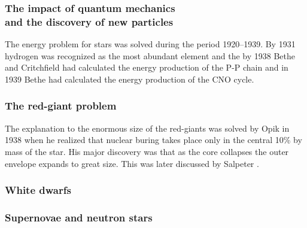 \subsubsection{The impact of quantum mechanics\\ and the discovery of new particles}

The energy problem for stars was solved during the period
1920--1939. By 1931  hydrogen was recognized as the
most abundant element and the by 1938 Bethe and
Critchfield \cite{Bethe1938} had calculated the energy production of
the P-P chain and in 1939 Bethe had calculated the energy production
of the CNO cycle.

\subsubsection{The red-giant problem}

The explanation  to the enormous size of the
red-giants was solved by Opik in 1938 \cite{Opik1938} when he realized
that nuclear buring takes place only in the central 10\% by mass of
the star. His major discovery was that as the core collapses the outer
envelope expands to great size.  This was later discussed by
Salpeter \cite{Salpeter1952}.

\subsubsection{White dwarfs}

\subsubsection{Supernovae and neutron stars}

